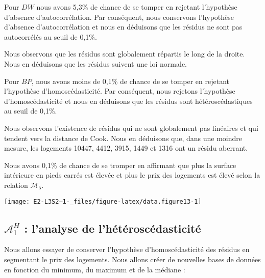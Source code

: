 \documentclass[
  11pt,
  french,
]{article}
\begin{document}
Pour \(DW\) nous avons 5,3\% de chance de se tomper en rejetant
l'hypothèse d'absence d'autocorrélation. Par conséquent, nous conservons
l'hypothèse d'absence d'autocorrélation et nous en déduisons que les
résidus ne sont pas autocorrélés au seuil de 0,1\%.

Nous observons que les résidus sont globalement répartis le long de la
droite. Nous en déduisons que les résidus suivent une loi normale.

Pour \(BP\), nous avons moins de 0,1\% de chance de se tomper en
rejetant l'hypothèse d'homoscédasticité. Par conséquent, nous rejetons
l'hypothèse d'homoscédasticité et nous en déduisons que les résidus sont
hétéroscédastiques au seuil de 0,1\%.

Nous observons l'existence de résidus qui ne sont globalement pas
linéaires et qui tendent vers la distance de Cook. Nous en déduisons
que, dans une moindre mesure, les logements 10447, 4412, 3915, 1449 et
1316 ont un résidu aberrant.

Nous avons 0,1\% de chance de se tromper en affirmant que plus la
surface intérieure en pieds carrés est élevée et plus le prix des
logements est élevé selon la relation \(\mathcal{M}_{5}\).

\begin{center}\texttt{[image: E2-L3S2--1-\_files/figure-latex/data.figure13-1]} \end{center}

\newpage

\hypertarget{mathcala_1h-lanalyse-de-lhuxe9tuxe9roscuxe9dasticituxe9}{%
\subsection{\texorpdfstring{\(\mathcal{A}_{1}^{H}\) : l'analyse de
l'hétéroscédasticité}{\textbackslash mathcal\{A\}\_\{1\}\^{}\{H\} : l'analyse de l'hétéroscédasticité}}\label{mathcala_1h-lanalyse-de-lhuxe9tuxe9roscuxe9dasticituxe9}}

Nous allons essayer de conserver l'hypothèse d'homoscédasticité des
résidus en segmentant le prix des logements. Nous allons créer de
nouvelles bases de données en fonction du minimum, du maximum et de la
médiane :
\end{document}
